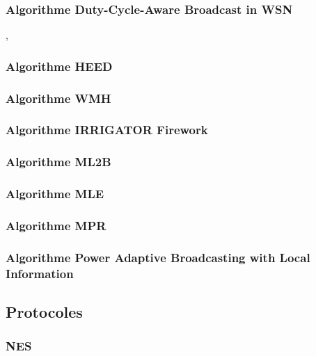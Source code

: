 \subsubsection{Algorithme Duty-Cycle-Aware Broadcast in WSN }
\cite{Wang2009},\cite{Wang2010}
\subsubsection{Algorithme HEED}
\cite{Younis2004}
\subsubsection{Algorithme WMH}
\cite{Agarwal2005}
\subsubsection{Algorithme IRRIGATOR  Firework}
\cite{orecchia2004}
\subsubsection{Algorithme ML2B}
\cite{zhaobroadcast}
\subsubsection{Algorithme MLE}
\cite{Cheng2006}
\subsubsection{Algorithme MPR}

\subsubsection{Algorithme Power Adaptive Broadcasting with Local Information}
\cite{Chen2003}



\subsection{Protocoles}
\subsubsection{NES}


